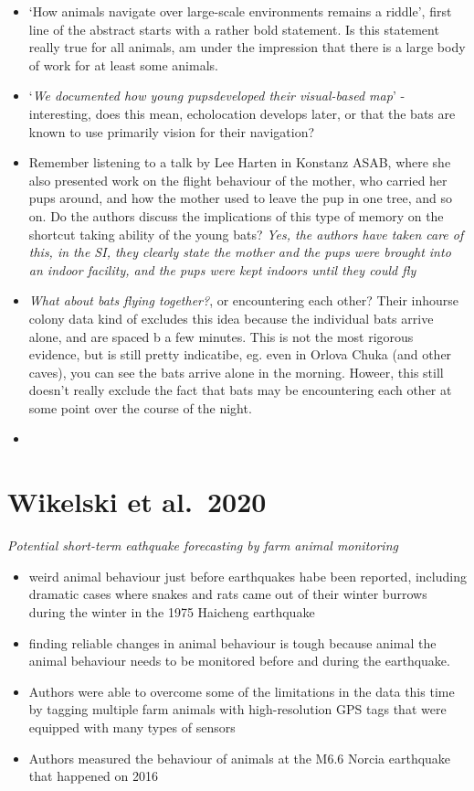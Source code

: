 \documentclass[
]{book}
\begin{document}
\begin{itemize}
\item
  `How animals navigate over large-scale environments remains a riddle', first line of the abstract starts with a rather bold statement. Is this statement really true for all animals, am under the impression that there is a large body of work for at least some animals.
\item
  `\emph{We documented how young pupsdeveloped their visual-based map}' - interesting, does this mean, echolocation develops later, or that the bats are known to use primarily vision for their navigation?
\item
  Remember listening to a talk by Lee Harten in Konstanz ASAB, where she also presented work on the flight behaviour of the mother, who carried her pups around, and how the mother used to leave the pup in one tree, and so on. Do the authors discuss the implications of this type of memory on the shortcut taking ability of the young bats? \emph{Yes, the authors have taken care of this, in the SI, they clearly state the mother and the pups were brought into an indoor facility, and the pups were kept indoors until they could fly}
\item
  \emph{What about bats flying together?}, or encountering each other? Their inhourse colony data kind of excludes this idea because the individual bats arrive alone, and are spaced b a few minutes. This is not the most rigorous evidence, but is still pretty indicatibe, eg. even in Orlova Chuka (and other caves), you can see the bats arrive alone in the morning. Howeer, this still doesn't really exclude the fact that bats may be encountering each other at some point over the course of the night.
\item
\end{itemize}

\hypertarget{wikelskiearthquake}{%
\chapter{Wikelski et al.~2020}\label{wikelskiearthquake}}

\emph{Potential short-term eathquake forecasting by farm animal monitoring} \citep{wikelskiearthquake2020}

\begin{itemize}
\item
  weird animal behaviour just before earthquakes habe been reported, including dramatic cases where snakes and rats came out of their winter burrows during the winter in the 1975 Haicheng earthquake
\item
  finding reliable changes in animal behaviour is tough because animal the animal behaviour needs to be monitored before and during the earthquake.
\item
  Authors were able to overcome some of the limitations in the data this time by tagging multiple farm animals with high-resolution GPS tags that were equipped with many types of sensors
\item
  Authors measured the behaviour of animals at the M6.6 Norcia earthquake that happened on 2016
\end{itemize}
\end{document}
